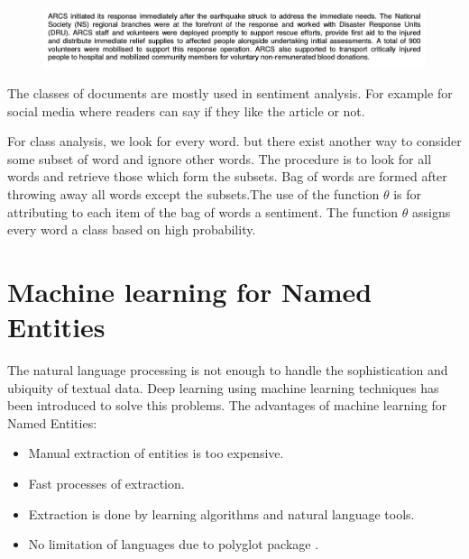{\centering{$\theta$}

\centering{$\Updownarrow$}   

\begin{figure}[hbtp]
\centering
\includegraphics[scale=0.5]{images/report.png}\label{report}
\end{figure}

{\centering{$\Updownarrow$}}

{}

}
The classes of documents are mostly used in sentiment analysis. For example for social media where readers can say if they like the article or not.

For class analysis, we look for every word. but there exist another way to consider some subset of word and ignore other words.
The procedure is to look for all words and retrieve those which form the subsets.  Bag of words are formed after throwing away  all words except the subsets.The use of the function $\theta$  is for  attributing  to each item of the bag of words a sentiment. The function $\theta$  assigns every word a class based on high probability.


\section{Machine learning for Named Entities\label{Chapter2}}
The natural language processing is not enough to handle the sophistication and ubiquity of textual data. Deep learning using machine learning techniques has been introduced to solve this problems. The advantages of machine learning for Named Entities:
\begin{itemize}
\item Manual extraction of entities is too expensive.
\item Fast processes of extraction.
\item Extraction is done by learning algorithms and natural language tools.
\item No limitation of languages due to polyglot package .
\end{itemize}

